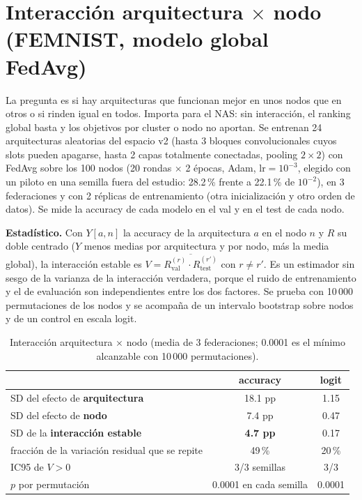\documentclass[11pt,a4paper]{article}
\begin{document}
\section{Interacción arquitectura $\times$ nodo (FEMNIST, modelo global FedAvg)}
\label{sec:an}
La pregunta es si hay arquitecturas que funcionan mejor en unos nodos que en otros o si rinden igual en todos. Importa para el NAS: sin interacción, el ranking global basta y los objetivos por cluster o nodo no aportan. Se entrenan 24 arquitecturas aleatorias del espacio v2 (hasta 3 bloques convolucionales cuyos slots pueden apagarse, hasta 2 capas totalmente conectadas, pooling $2\times2$) con FedAvg sobre los 100 nodos (20 rondas $\times$ 2 épocas, Adam, $\mathrm{lr}=10^{-3}$, elegido con un piloto en una semilla fuera del estudio: 28.2\,\% frente a 22.1\,\% de $10^{-2}$), en 3 federaciones y con 2 réplicas de entrenamiento (otra inicialización y otro orden de datos). Se mide la accuracy de cada modelo en el val y en el test de cada nodo.

\textbf{Estadístico.} Con $Y[a,n]$ la accuracy de la arquitectura $a$ en el nodo $n$ y $R$ su doble centrado ($Y$ menos medias por arquitectura y por nodo, más la media global), la interacción estable es $V=\overline{R_{\mathrm{val}}^{(r)}\cdot R_{\mathrm{test}}^{(r')}}$ con $r\neq r'$. Es un estimador sin sesgo de la varianza de la interacción verdadera, porque el ruido de entrenamiento y el de evaluación son independientes entre los dos factores. Se prueba con 10\,000 permutaciones de los nodos y se acompaña de un intervalo bootstrap sobre nodos y de un control en escala logit.

\begin{table}[h]
\centering\small
\begin{tabular}{lcc}
\toprule
 & accuracy & logit\\
\midrule
SD del efecto de \textbf{arquitectura} & 18.1 pp & 1.15\\
SD del efecto de \textbf{nodo} & 7.4 pp & 0.47\\
SD de la \textbf{interacción estable} & \textbf{4.7 pp} & 0.17\\
fracción de la variación residual que se repite & 49\,\% & 20\,\%\\
IC95 de $V>0$ & 3/3 semillas & 3/3\\
$p$ por permutación & 0.0001 en cada semilla & 0.0001\\
\bottomrule
\end{tabular}
\caption{Interacción arquitectura $\times$ nodo (media de 3 federaciones; 0.0001 es el mínimo alcanzable con 10\,000 permutaciones).}
\label{tab:an}
\end{table}
\end{document}

